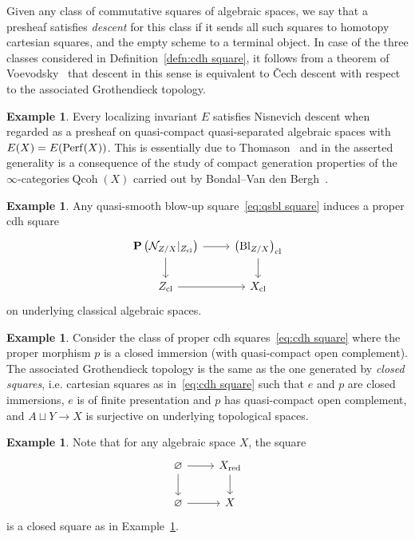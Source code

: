 \documentclass[11pt]{article}
\theoremstyle{definition}
\newtheorem{exam}[theo]{Example}
\numberwithin{equation}{section}
\numberwithin{figure}{section}
\numberwithin{table}{section}
\newcommand{\sN}{\ensuremath{\mathcal{N}}\xspace}
\newcommand{\bP}{\ensuremath{\mathbf{P}}\xspace}
\newcommand{\initialobj}{\varnothing}
\newcommand{\red}{{\mrm{red}}}
\newcommand{\cl}{{\mrm{cl}}}
\renewcommand{\P}{\bP}
\DeclareMathOperator{\Qcoh}{Qcoh}
\DeclareMathOperator{\Perf}{Perf}
\DeclareMathOperator{\Bl}{Bl}
\newcommand{\mrm}[1]{\ensuremath{\mathrm{#1}}\xspace}
\begin{document}
Given any class of commutative squares of algebraic spaces, we say that a presheaf satisfies \emph{descent} for this class if it sends all such squares to homotopy cartesian squares, and the empty scheme to a terminal object. In case of the three classes considered in
Definition~\ref{defn:cdh square}, it follows from a theorem of Voevodsky~\cite[Corollary~5.10]{VoevodskyCD} that descent in this sense is equivalent to Čech descent with respect to the associated Grothendieck topology.

\begin{exam}\label{exam:Nis descent for E localizing}
Every localizing invariant $E$ satisfies Nisnevich descent when regarded as a presheaf on quasi-compact quasi-separated algebraic spaces with $E(X)\linebreak= E(\Perf(X))$. This is essentially due to Thomason~\cite{ThomasonTrobaugh} and in the asserted generality is a consequence of the study of compact generation properties of the $\infty$-categories\;$\Qcoh(X)$ carried out by Bondal--Van den Bergh~\cite{BondalVDB}.
\end{exam}

\begin{exam}\label{exam:qsbl square cl}
Any quasi-smooth blow-up square~\eqref{eq:qsbl square} induces a proper cdh square
\[
\begin{tikzcd}
\P\left(\sN_{Z/X}|_{Z_\cl}\right) \ar{r}\ar{d} & \left(\Bl_{Z/X}\right)_\cl \ar{d}
\\
Z_\cl \ar{r} & X_\cl
\end{tikzcd}
\]
on underlying classical algebraic spaces.
\end{exam}

\begin{exam}\label{exam:closed square}
Consider the class of proper cdh squares~\eqref{eq:cdh square} where the proper morphism $p$ is a closed immersion (with quasi-compact open complement). The associated Grothendieck topology is the same as the one generated by \emph{closed squares}, i.e. cartesian squares as in~\eqref{eq:cdh square} such that $e$ and $p$ are closed immersions, $e$ is of finite presentation and $p$ has quasi-compact open complement, and $A \sqcup Y \to X$ is surjective on underlying topological spaces.
\end{exam}

\begin{exam}\label{exam:nil-immersion}
Note that for any algebraic space $X$, the square
\[
\begin{tikzcd}
\initialobj \ar{r}\ar{d} & X_\red \ar{d}
\\
\initialobj \ar{r} & X
\end{tikzcd}
\]
is a closed square as in Example~\ref{exam:closed square}.
\end{exam}
\end{document}
